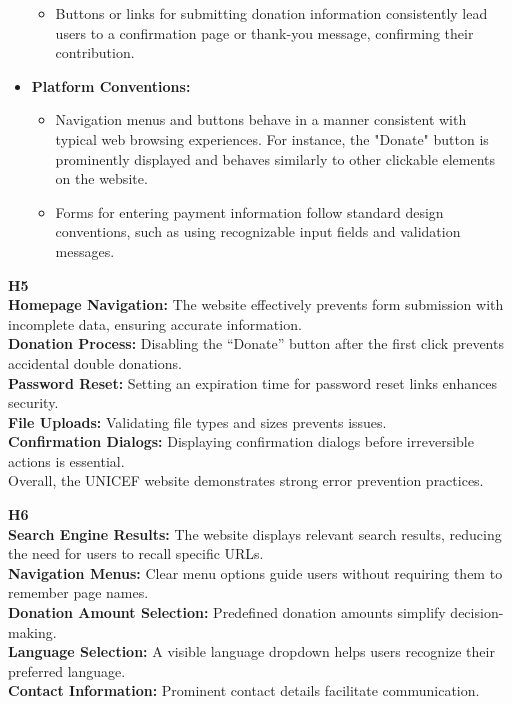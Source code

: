 \begin{description}
\begin{itemize}
\begin{itemize}
            \item Buttons or links for submitting donation information consistently lead users to a confirmation page or thank-you message, confirming their contribution.
        \end{itemize}
        \item \textbf{Platform Conventions:}
        \begin{itemize}
            \item Navigation menus and buttons behave in a manner consistent with typical web browsing experiences. For instance, the "Donate" button is prominently displayed and behaves similarly to other clickable elements on the website.
            \item Forms for entering payment information follow standard design conventions, such as using recognizable input fields and validation messages.
        \end{itemize}
    \end{itemize}
    \item {\textbf{H5} \color{unicefGray}{Error prevention}}\\
    \textbf{Homepage Navigation:} The website effectively prevents form submission with incomplete data, ensuring accurate information.\\
    \textbf{Donation Process:} Disabling the “Donate” button after the first click prevents accidental double donations.\\
    \textbf{Password Reset:} Setting an expiration time for password reset links enhances security.\\
    \textbf{File Uploads:} Validating file types and sizes prevents issues.\\
    \textbf{Confirmation Dialogs:} Displaying confirmation dialogs before irreversible actions is essential.\\
    Overall, the UNICEF website demonstrates strong error prevention practices.
    \item {\textbf{H6} \color{unicefGray}{Recognition rather than recall}}\\
    \textbf{Search Engine Results:} The website displays relevant search results, reducing the need for users to recall specific URLs.\\
    \textbf{Navigation Menus:} Clear menu options guide users without requiring them to remember page names.\\
    \textbf{Donation Amount Selection:} Predefined donation amounts simplify decision-making.\\
    \textbf{Language Selection:} A visible language dropdown helps users recognize their preferred language.\\
    \textbf{Contact Information:} Prominent contact details facilitate communication.
\end{description}
